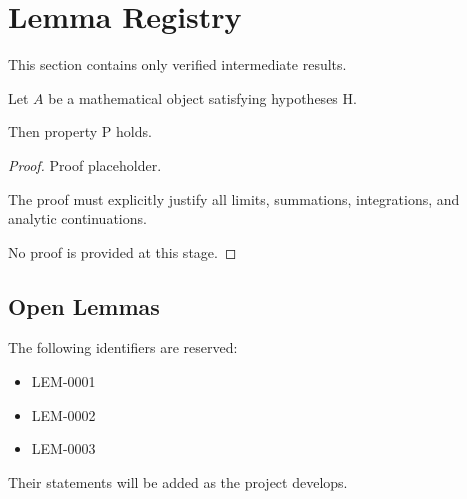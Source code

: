 \section{Lemma Registry}

This section contains only verified intermediate results.

\begin{lemma}[Template]
Let $A$ be a mathematical object satisfying hypotheses H.

Then property P holds.
\end{lemma}

\begin{proof}
Proof placeholder.

The proof must explicitly justify all
limits, summations, integrations, and
analytic continuations.

No proof is provided at this stage.
\end{proof}

\subsection{Open Lemmas}

The following identifiers are reserved:

\begin{itemize}
\item LEM-0001
\item LEM-0002
\item LEM-0003
\end{itemize}

Their statements will be added as the project develops.